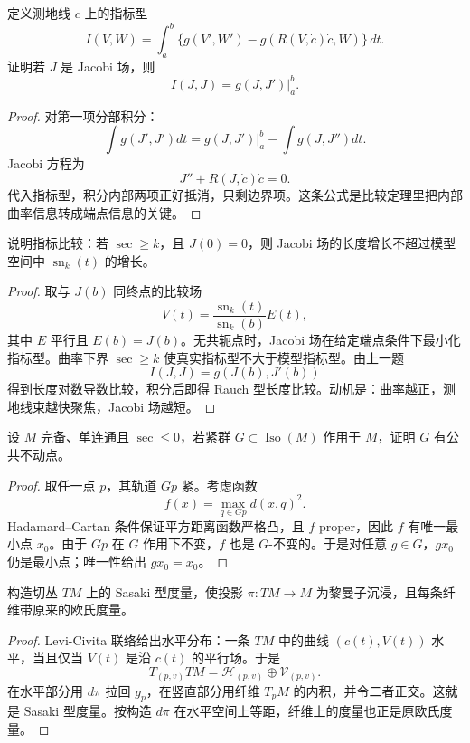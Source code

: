 \documentclass[11pt,a4paper,openany]{ctexbook}
\numberwithin{equation}{chapter}
\begin{document}
\begin{problem}
定义测地线 \(c\) 上的指标型
\[
I(V,W)=\int_a^b\{g(V',W')-g(R(V,\dot c)\dot c,W)\}\,dt.
\]
证明若 \(J\) 是 Jacobi 场，则
\[
I(J,J)=g(J,J')\big|_a^b.
\]
\end{problem}
\begin{proof}
对第一项分部积分：
\[
\int g(J',J')dt=g(J,J')\big|_a^b-\int g(J,J'')dt.
\]
Jacobi 方程为
\[
J''+R(J,\dot c)\dot c=0.
\]
代入指标型，积分内部两项正好抵消，只剩边界项。这条公式是比较定理里把内部曲率信息转成端点信息的关键。
\end{proof}

\begin{problem}
说明指标比较：若 \(\sec\ge k\)，且 \(J(0)=0\)，则 Jacobi 场的长度增长不超过模型空间中 \(\operatorname{sn}_k(t)\) 的增长。
\end{problem}
\begin{proof}
取与 \(J(b)\) 同终点的比较场
\[
V(t)=\frac{\operatorname{sn}_k(t)}{\operatorname{sn}_k(b)}E(t),
\]
其中 \(E\) 平行且 \(E(b)=J(b)\)。无共轭点时，Jacobi 场在给定端点条件下最小化指标型。曲率下界 \(\sec\ge k\) 使真实指标型不大于模型指标型。由上一题
\[
I(J,J)=g(J(b),J'(b))
\]
得到长度对数导数比较，积分后即得 Rauch 型长度比较。动机是：曲率越正，测地线束越快聚焦，Jacobi 场越短。
\end{proof}

\begin{problem}
设 \(M\) 完备、单连通且 \(\sec\le0\)，若紧群 \(G\subset\operatorname{Iso}(M)\) 作用于 \(M\)，证明 \(G\) 有公共不动点。
\end{problem}
\begin{proof}
取任一点 \(p\)，其轨道 \(Gp\) 紧。考虑函数
\[
f(x)=\max_{q\in Gp} d(x,q)^2.
\]
Hadamard--Cartan 条件保证平方距离函数严格凸，且 \(f\) proper，因此 \(f\) 有唯一最小点 \(x_0\)。由于 \(Gp\) 在 \(G\) 作用下不变，\(f\) 也是 \(G\)-不变的。于是对任意 \(g\in G\)，\(g x_0\) 仍是最小点；唯一性给出 \(gx_0=x_0\)。
\end{proof}

\begin{problem}
构造切丛 \(TM\) 上的 Sasaki 型度量，使投影 \(\pi\colon TM\to M\) 为黎曼子沉浸，且每条纤维带原来的欧氏度量。
\end{problem}
\begin{proof}
Levi-Civita 联络给出水平分布：一条 \(TM\) 中的曲线 \((c(t),V(t))\) 水平，当且仅当 \(V(t)\) 是沿 \(c(t)\) 的平行场。于是
\[
T_{(p,v)}TM=\mathcal H_{(p,v)}\oplus \mathcal V_{(p,v)}.
\]
在水平部分用 \(d\pi\) 拉回 \(g_p\)，在竖直部分用纤维 \(T_pM\) 的内积，并令二者正交。这就是 Sasaki 型度量。按构造 \(d\pi\) 在水平空间上等距，纤维上的度量也正是原欧氏度量。
\end{proof}
\end{document}
